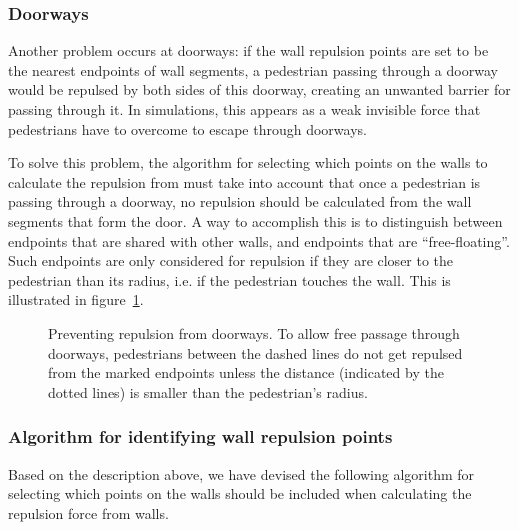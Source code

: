 \subsubsection{Doorways}
Another problem occurs at doorways: if the wall repulsion points are set to be 
the nearest endpoints of wall segments, a pedestrian passing through a doorway 
would be repulsed by both sides of this doorway, creating an unwanted barrier 
for passing through it. In simulations, this appears as a weak invisible force 
that pedestrians have to overcome to escape through doorways.

To solve this problem, the algorithm for selecting which points on the walls 
to calculate the repulsion from must take into account that once a pedestrian 
is passing through a doorway, no repulsion should be calculated from the wall 
segments that form the door. A way to accomplish this is to distinguish 
between endpoints that are shared with other walls, and endpoints that are 
``free-floating''. Such endpoints are only considered for repulsion if they 
are closer to the pedestrian than its radius, i.e. if the pedestrian touches 
the wall. This is illustrated in figure~\ref{fig:doorways}.

\begin{figure}[h]
    \centering

    \caption[Preventing repulsion from doorways]{Preventing repulsion from 
    doorways. To allow free passage through doorways, pedestrians between the 
    dashed lines do not get repulsed from the marked endpoints unless the 
    distance (indicated by the dotted lines) is smaller than the pedestrian's 
    radius.}
    \label{fig:doorways}
\end{figure}

\subsubsection{Algorithm for identifying wall repulsion points}
\label{sec:repulsion-points-algorithm}
Based on the description above, we have devised the following algorithm for 
selecting which points on the walls should be included when calculating the 
repulsion force from walls.


